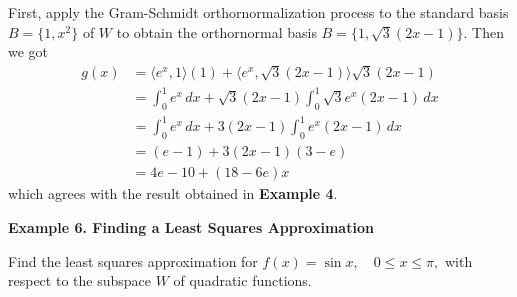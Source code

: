 \documentclass{article}
\newcommand\la{\langle}
\newcommand\ra{\rangle}
\begin{document}
    First, apply the Gram-Schmidt orthornormalization process to the standard basis $B = \{1, x^2\}$ of $W$
    to obtain the orthornormal basis $B = \{1, \sqrt{3}(2x - 1) \}$. Then we got
    \begin{equation*}
        \begin{split}
            g(x) &= \la e^x, 1 \ra(1) + \la e^x, \sqrt{3}(2x - 1) \ra \sqrt{3}(2x - 1) \\
                 &= \int_0^1 e^x\,dx + \sqrt{3}(2x - 1)\int_0^1 \sqrt{3}e^x(2x - 1)\,dx \\
                 &= \int_0^1 e^x\,dx + 3(2x - 1)\int_0^1 e^x(2x - 1)\,dx \\
                 &= (e - 1) + 3(2x - 1)(3 - e) \\
                 &= 4e - 10 + (18 - 6e)x
        \end{split}
    \end{equation*}
    which agrees with the result obtained in \textbf{Example 4}.

    \textbf{Example 6. \textcolor{blue5}{Finding a Least Squares Approximation}}

    Find the least squares approximation for $f(x) = \sin{x}, \quad 0 \le x \le \pi,$ with respect to the subspace $W$
    of quadratic functions.
\end{document}
